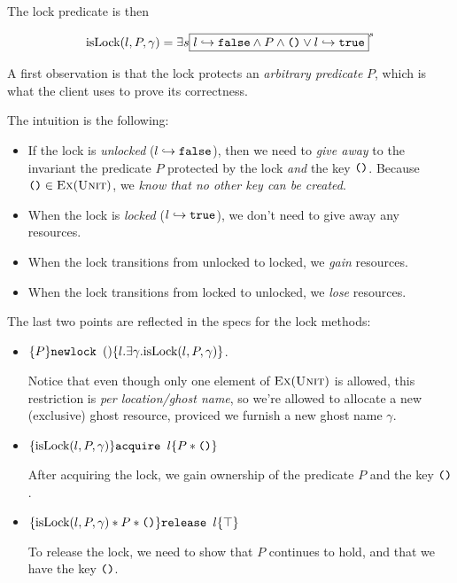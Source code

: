 The lock predicate is then

\[ \text{isLock}{(l, P, \gamma)} = \exists{s}{\fbox{$l \hookrightarrow \texttt{false} \land P \land \texttt{()} \lor l \hookrightarrow \texttt{true}  $}^{s}} \]

A first observation is that the lock protects an \emph{arbitrary predicate} $P$, which is what the client uses to prove its correctness.

The intuition is the following:
\begin{itemize}

\item If the lock is \emph{unlocked} ($l \hookrightarrow \texttt{false}$), then we need to \emph{give away} to the invariant the predicate $P$ protected by the lock \emph{and} the key $\texttt{()}$. Because $\texttt{()} \in \textsc{Ex}(\textsc{Unit})$, we \emph{know that no other key can be created}.

\item When the lock is \emph{locked} ($l \hookrightarrow \texttt{true}$), we don't need to give away any resources.

\item When the lock transitions from unlocked to locked, we \emph{gain} resources.

\item When the lock transitions from locked to unlocked, we \emph{lose} resources.

\end{itemize}

The last two points are reflected in the specs for the lock methods:

\begin{itemize}

\item $\{P\} \texttt{newlock } () \{l.  \exists \gamma. \text{isLock}{(l, P, \gamma)}\}$.

Notice that even though only one element of $\textsc{Ex}(\textsc{Unit})$ is allowed, this restriction is \emph{per location/ghost name}, so we're allowed to allocate a new (exclusive) ghost resource, proviced we furnish a new ghost name $\gamma$.

\item $\{\text{isLock}{(l, P, \gamma)}\} \texttt{acquire } l \{P * \texttt{()}\}$

After acquiring the lock, we gain ownership of the predicate $P$ and the key $\texttt{()}$.

\item $\{\text{isLock}{(l, P, \gamma)} * P * \texttt{()}\} \texttt{release } l \{\top\}$

To release the lock, we need to show that $P$ continues to hold, and that we have the key $\texttt{()}$.

\end{itemize}

